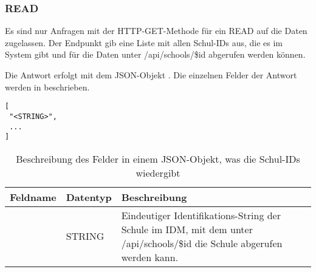\subsubsection{READ}
\label{sec:rest:api:school:read}
Es sind nur Anfragen mit der HTTP-GET-Methode für ein READ auf die Daten zugelassen.
Der Endpunkt gib eine Liste mit allen Schul-IDs aus, die es im System gibt und für die Daten unter /api/schools/\$id abgerufen werden können.

Die Antwort erfolgt mit dem JSON-Objekt . 
Die einzelnen Felder der Antwort werden in  beschrieben.

\begin{lstlisting}[caption={JSON-Antwort für einen GET-Aufruf des Pfads /api/schools},label={lst:code:rest:api:school:read:ret},frame=tlrb]
[
 "<STRING>",
 ...
]
\end{lstlisting}

\begin{longtable}{|p{}|p{}|p{}|}
		\caption{Beschreibung des Felder in einem JSON-Objekt, was die Schul-IDs wiedergibt}
\endfoot
		\caption{Beschreibung des Felder in einem JSON-Objekt, was die Schul-IDs wiedergibt}
		\label{tab:rest:api:school:read:ret}
\endlastfoot 
\hline
			\textbf{Feldname} & \textbf{Datentyp} & \textbf{Beschreibung} \\ \hline
\endhead
 & STRING & Eindeutiger Identifikations-String der Schule im IDM, mit dem unter /api/schools/\$id die Schule abgerufen werden kann.\\ \hline
\end{longtable}
